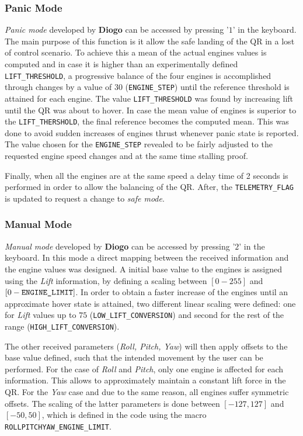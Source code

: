 \documentclass{article}
\begin{document}
\subsubsection{Panic Mode}
\textit{Panic mode} developed by \textbf{Diogo} can be accessed by pressing '$1$' in the keyboard. The main purpose of this function is it allow the safe landing of the QR in a lost of control scenario. To achieve this a mean of the actual engines values is computed and in case it is higher than an experimentally defined \texttt{LIFT\_THRESHOLD}, a progressive balance of the four engines is accomplished through changes by a value of $30$ (\texttt{ENGINE\_STEP}) until the reference threshold is attained for each engine. The value \texttt{LIFT\_THRESHOLD} was found by increasing lift until the QR was about to hover.  In case the mean value of engines is superior to the \texttt{LIFT\_THERSHOLD}, the final reference becomes the computed mean. This was done to avoid sudden increases of engines thrust whenever panic state is reported. The value chosen for the \texttt{ENGINE\_STEP} revealed to be fairly adjusted to the requested engine speed changes and at the same time stalling proof.

Finally, when all the engines are at the same speed a delay time of 2 seconds is performed in order to allow the balancing of the QR. After, the \texttt{TELEMETRY\_FLAG} is updated to request a change to \textit{safe mode}.

\subsubsection{Manual Mode}
\textit{Manual mode} developed by \textbf{Diogo} can be accessed by pressing '$2$' in the keyboard. In this mode a direct mapping between the received information and the engine values was designed. A initial base value to the engines is assigned using the \textit{Lift} information, by defining a scaling between $[0-255]$ and $[0-\text{\texttt{ENGINE\_LIMIT}}]$. In order to obtain a faster increase of the engines until an approximate hover state is attained, two different linear scaling were defined: one for \textit{Lift} values up to $75$ (\texttt{LOW\_LIFT\_CONVERSION}) and second for the rest of the range (\texttt{HIGH\_LIFT\_CONVERSION}).

The other received parameters (\textit{Roll, Pitch, Yaw}) will then apply offsets to the base value defined, such that the intended movement by the user can be performed. For the case of \textit{Roll} and \textit{Pitch}, only one engine is affected for each information. This allows to approximately maintain a constant lift force in the QR. For the \textit{Yaw} case and due to the same reason, all engines suffer symmetric offsets. The scaling of the latter parameters is done between $[-127,127]$ and $[-50,50]$, which is defined in the code using the macro \texttt{ROLLPITCHYAW\_ENGINE\_LIMIT}. 
\end{document}
